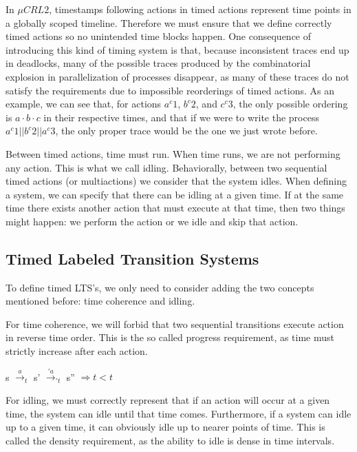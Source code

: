 \documentclass[11pt]{article}
\theoremstyle{definition}
\theoremstyle{plain}
\theoremstyle{definition}
\begin{document}
In $ \mu CRL2 $, timestamps following actions in timed actions represent time points in a globally scoped timeline. Therefore we must ensure that we define correctly timed actions so no unintended time blocks happen. One consequence of introducing this kind of timing system is that, because inconsistent traces end up in deadlocks, many of the possible traces produced by the combinatorial explosion in parallelization of processes disappear, as many of these traces do not satisfy the requirements due to impossible reorderings of timed actions. As an example, we can see that, for actions $ a^c 1 $, $ b^c 2 $, and $ c^c 3 $, the only possible ordering is $ a·b·c $ in their respective times, and that if we were to write the process $ a^c 1 || b^c 2 || a^c 3 $, the only proper trace would be the one we just wrote before.

Between timed actions, time must run. When time runs, we are not performing any action. This is what we call idling. Behaviorally, between two sequential timed actions (or multiactions) we consider that the system idles. When defining a system, we can specify that there can be idling at a given time. If at the same time there exists another action that must execute at that time, then two things might happen: we perform the action or we idle and skip that action.

\subsection{Timed Labeled Transition Systems}

To define timed LTS's, we only need to consider adding the two concepts mentioned before: time coherence and idling.

For time coherence, we will forbid that two sequential transitions execute action in reverse time order. This is the so called progress requirement, as time must strictly increase after each action.

\begin{center}
 s $ \xrightarrow{a}_{t} $ s' $ \xrightarrow{'a}_{'t} $ s'' $ \Rightarrow t < t $
\end{center}

For idling, we must correctly represent that if an action will occur at a given time, the system can idle until that time comes. Furthermore, if a system can idle up to a given time, it can obviously idle up to nearer points of time. This is called the density requirement, as the ability to idle is dense in time intervals.
\end{document}
